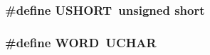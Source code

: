 \subsubsection[{USHORT}]{\setlength{\rightskip}{0pt plus 5cm}\#define USHORT~unsigned short}\label{pipsqueak_2types_8h_aea50feaf24fd53b7ffab0e9b62ff30a6}
\subsubsection[{WORD}]{\setlength{\rightskip}{0pt plus 5cm}\#define WORD~UCHAR}\label{pipsqueak_2types_8h_a4cfc63e05db4883dc4b60a1245a9ffc5}
